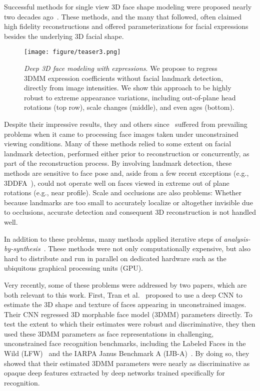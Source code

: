 \documentclass[a4paper, 10pt, conference]{ieeeconf}
\begin{document}
Successful methods for single view 3D face shape modeling were proposed nearly two decades ago~\cite{blanz2002face,blanz2003face,paysan09basel,romdhani2003efficient}. These methods, and the many that followed, often claimed high fidelity reconstructions and offered parameterizations for facial expressions besides the underlying 3D facial shape.

 \begin{figure}[tb]
 \centering
 \texttt{[image: figure/teaser3.png]}
 \caption{
 {\em Deep 3D face modeling with expressions}. We propose to regress 3DMM expression coefficients without facial landmark detection, directly from image intensities. We show this approach to be highly robust to extreme appearance variations, including out-of-plane head rotations (top row), scale changes (middle), and even ages (bottom).
 }
 \label{fig:teaser}
 \end{figure}

Despite their impressive results, they and others since~\cite{blanz2002face,blanz2003face,chu2014,paysan09basel,romdhani2003efficient,tang2008real,yang2011expression} suffered from prevailing problems when it came to processing face images taken under unconstrained viewing conditions. Many of these methods relied to some extent on facial landmark detection, performed either prior to reconstruction or concurrently, as part of the reconstruction process. By involving landmark detection, these methods are sensitive to face pose and, aside from a few recent exceptions (e.g., 3DDFA~\cite{zhu2015}), could not operate well on faces viewed in extreme out of plane rotations (e.g., near profile). Scale and occlusions are also problems: Whether because landmarks are too small to accurately localize or altogether invisible due to occlusions, accurate detection and consequent 3D reconstruction is not handled well.

In addition to these problems, many methods applied iterative steps of {\em analysis-by-synthesis}~\cite{Bas:accvw16,huber:3dmm,romdhani2005estimating}. These methods were not only computationally expensive, but also hard to distribute and run in parallel on dedicated hardware such as the ubiquitous graphical processing units (GPU).


Very recently, some of these problems were addressed by two papers, which are both relevant to this work. First, Tran et al.~\cite{tran16_3dmm_cnn} proposed to use a deep CNN to estimate the 3D shape and texture of faces appearing in unconstrained images. Their CNN regressed 3D morphable face model (3DMM) parameters directly. To test the extent to which their estimates were robust and discriminative, they then used these 3DMM parameters as face representations in challenging, unconstrained face recognition benchmarks, including the Labeled Faces in the Wild (LFW)~\cite{LFWTech} and the IARPA Janus Benchmark A (IJB-A)~\cite{Klare_2015_CVPR}. By doing so, they showed that their estimated 3DMM parameters were nearly as discriminative as opaque deep features extracted by deep networks trained specifically for recognition.
\end{document}
